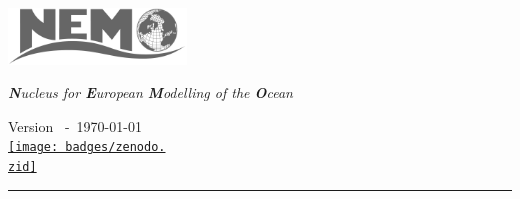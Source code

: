 
\begin{titlepage}
  \setlength{\parindent}{0pt}

  \begin{center}
    \begin{minipage}{0.3\textwidth}
      \includegraphics[height=1.5cm]{logos/NEMO_grey}
    \end{minipage}\begin{minipage}{0.6\textwidth}
      \begin{center}
      \Large\slshape
      \textbf{N}ucleus for \textbf{E}uropean \textbf{M}odelling of the \textbf{O}cean \\
      \medskip
      \hyperref[resources]{\textcolor{black}{
          \faWordpress \hspace{0.75cm} \faCodeFork      \hspace{0.75cm}
          \faGithub    \hspace{0.75cm} \faCloudDownload \hspace{0.75cm} \faEnvelope
        }
      }
      \end{center}
    \end{minipage}
  \end{center}

  \spacetop
  \textcolor{white}{\fontsize{0.8cm}{0.8cm}\selectfont\textbf{\heading}}
  \ifdef{\subheading}{
    \medskip
    \par
    \textcolor{white}{\Huge \subheading}
  }{}
  \spacedown

  \begin{center}
    \LARGE Version \version\ -\ \today \\
    \medskip
    \href{http://doi.org/10.5281/zenodo.\zid}{ \texttt{[image: badges/zenodo.\\zid]} }
  \end{center}

  \vfill

  \begin{minipage}{\authorswidth}
    \raggedleft
    
  \end{minipage}\hspace{15pt}\begin{minipage}{0.02\linewidth}
    \rule{1pt}{}
  \end{minipage}\hspace{ 5pt}\begin{minipage}{\abstractwidth}
    \begin{abstract}
      
    \end{abstract}
  \end{minipage}


\end{titlepage}
